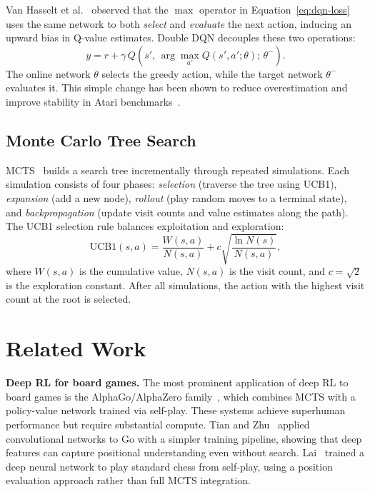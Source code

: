 \documentclass[letterpaper]{article}
\begin{document}
Van Hasselt et al.~\cite{van2016deep} observed that the $\max$ operator in Equation~\ref{eq:dqn-loss} uses the same network to both \emph{select} and \emph{evaluate} the next action, inducing an upward bias in Q-value estimates.
Double DQN decouples these two operations:
\begin{equation}\label{eq:ddqn-target}
    y = r + \gamma\, Q\!\left(s',\, \arg\max_{a'} Q(s', a'; \theta);\, \theta^{-}\right).
\end{equation}
The online network $\theta$ selects the greedy action, while the target network $\theta^{-}$ evaluates it.
This simple change has been shown to reduce overestimation and improve stability in Atari benchmarks~\cite{van2016deep}.

\subsection{Monte Carlo Tree Search}

MCTS~\cite{coulom2006,kocsis2006} builds a search tree incrementally through repeated simulations.
Each simulation consists of four phases: \emph{selection} (traverse the tree using UCB1), \emph{expansion} (add a new node), \emph{rollout} (play random moves to a terminal state), and \emph{backpropagation} (update visit counts and value estimates along the path).
The UCB1 selection rule balances exploitation and exploration:
\begin{equation}\label{eq:ucb1}
    \text{UCB1}(s, a) = \frac{W(s, a)}{N(s, a)} + c \sqrt{\frac{\ln N(s)}{N(s, a)}},
\end{equation}
where $W(s, a)$ is the cumulative value, $N(s, a)$ is the visit count, and $c = \sqrt{2}$ is the exploration constant.
After all simulations, the action with the highest visit count at the root is selected.


\section{Related Work}

\textbf{Deep RL for board games.}
The most prominent application of deep RL to board games is the AlphaGo/AlphaZero family~\cite{silver2016mastering,silver2018general}, which combines MCTS with a policy-value network trained via self-play.
These systems achieve superhuman performance but require substantial compute.
Tian and Zhu~\cite{tian2015} applied convolutional networks to Go with a simpler training pipeline, showing that deep features can capture positional understanding even without search.
Lai~\cite{lai2015} trained a deep neural network to play standard chess from self-play, using a position evaluation approach rather than full MCTS integration.
\end{document}
